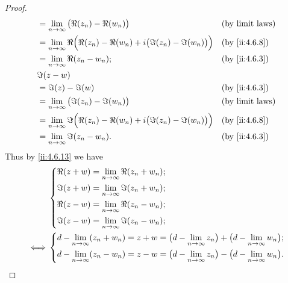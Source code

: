 \begin{proof}
\begin{align*}
     & = \lim_{n \to \infty} \big(\Re(z_n) - \Re(w_n)\big)                                      &  & \text{(by limit laws)} \\
     & = \lim_{n \to \infty} \Re\Big(\Re(z_n) - \Re(w_n) + i \big(\Im(z_n) - \Im(w_n)\big)\Big) &  & \by{ii:4.6.8}          \\
     & = \lim_{n \to \infty} \Re(z_n - w_n);                                                    &  & \by{ii:4.6.3}          \\
     & \Im(z - w)                                                                                                           \\
     & = \Im(z) - \Im(w)                                                                        &  & \by{ii:4.6.3}          \\
     & = \lim_{n \to \infty} \big(\Im(z_n) - \Im(w_n)\big)                                      &  & \text{(by limit laws)} \\
     & = \lim_{n \to \infty} \Im\Big(\Re(z_n) - \Re(w_n) + i \big(\Im(z_n) - \Im(w_n)\big)\Big) &  & \by{ii:4.6.8}          \\
     & = \lim_{n \to \infty} \Im(z_n - w_n).                                                    &  & \by{ii:4.6.3}          \\
  \end{align*}
  Thus by \cref{ii:4.6.13} we have
  \begin{align*}
         & \begin{dcases}
             \Re(z + w) = \lim_{n \to \infty} \Re(z_n + w_n); \\
             \Im(z + w) = \lim_{n \to \infty} \Im(z_n + w_n); \\
             \Re(z - w) = \lim_{n \to \infty} \Re(z_n - w_n); \\
             \Im(z - w) = \lim_{n \to \infty} \Im(z_n - w_n);
           \end{dcases}                                                                             \\
    \iff & \begin{dcases}
             d - \lim_{n \to \infty} (z_n + w_n) = z + w = \big(d - \lim_{n \to \infty} z_n\big) + \big(d - \lim_{n \to \infty} w_n\big); \\
             d - \lim_{n \to \infty} (z_n - w_n) = z - w = \big(d - \lim_{n \to \infty} z_n\big) - \big(d - \lim_{n \to \infty} w_n\big).
           \end{dcases}
  \end{align*}


\end{proof}
